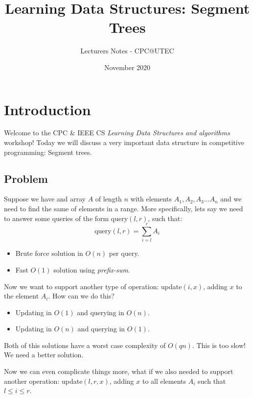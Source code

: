 \documentclass{article}
\begin{document}
\title{Learning Data Structures: Segment Trees}
\author{Lecturers Notes - CPC@UTEC}
\date{November 2020}

\maketitle

\setlength{\parskip}{7pt}
\setlength{\parindent}{0pt}

\section{Introduction}

Welcome to the CPC \& IEEE CS \textit{Learning Data Structures and algorithms} workshop! Today we will discuss a very important data structure in competitive programming: Segment trees.

\subsection{Problem}

Suppose we have and array $A$ of length $n$ with elements $A_1, A_2, A_3 \dots A_n$ and we need to find the same of elements in a range. More specifically, lets say we need to answer some queries of the form query$(l, r)$, such that:
$$\text{query}(l,r) = \sum_{i = l}^r A_i$$

\begin{itemize}
	\item Brute force solution in $O(n)$ per query.
	\item Fast $O(1)$ solution using \textit{prefix-sum}.
\end{itemize}

Now we want to support another type of operation: update$(i, x)$, adding $x$ to the element $A_i$. How can we do this?

\begin{itemize}
	\item Updating in $O(1)$ and querying in $O(n)$.
	\item Updating in $O(n)$ and querying in $O(1)$.
\end{itemize}

Both of this solutions have a worst case complexity of $O(qn)$. This is too slow! We need a better solution.

Now we can even complicate things more, what if we also needed to support another operation: update$(l, r, x)$, adding $x$ to all elements $A_i$ such that $l \leq i \leq r$.
\end{document}
